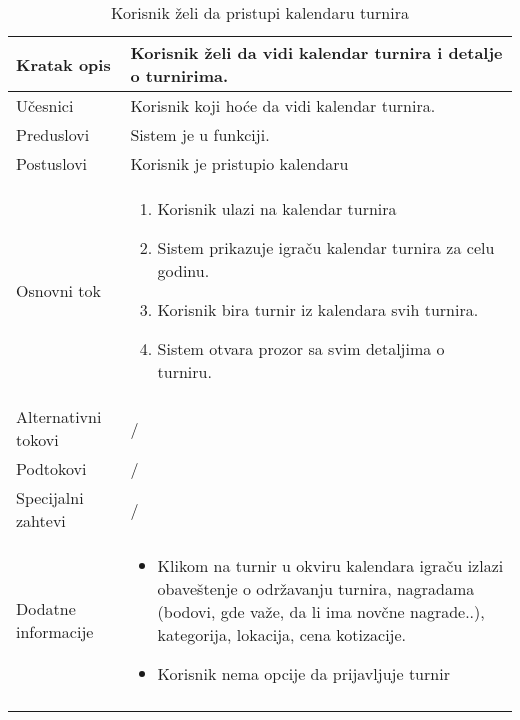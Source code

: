 \documentclass{article}
\begin{document}
         \begin{longtable}{| p{} | p{} |} 
            \hline
                Kratak opis & Korisnik želi da vidi kalendar turnira i detalje o turnirima.\\ 
            \hline    
                Učesnici & Korisnik koji hoće da vidi kalendar turnira. \\
            \hline
               Preduslovi &  Sistem je u funkciji.\\
            \hline  
                Postuslovi &  Korisnik je pristupio kalendaru\\
            \hline
                Osnovni tok & \begin{enumerate}
                    \item Korisnik ulazi na kalendar turnira
                    \item Sistem prikazuje igraču kalendar turnira za celu godinu.
                    \item Korisnik bira turnir iz kalendara svih turnira.
                    \item Sistem otvara prozor sa svim detaljima o turniru.
                \end{enumerate}\\
            \hline
                Alternativni tokovi & /\\
            \hline
                Podtokovi & /\\
            \hline
                Specijalni zahtevi & /\\
            \hline
                Dodatne informacije & \begin{itemize}
                \item Klikom na turnir u okviru kalendara igraču izlazi obaveštenje o održavanju turnira, nagradama (bodovi, gde važe, da li ima novčne nagrade..), kategorija, lokacija, cena kotizacije. 
                \item Korisnik nema opcije da prijavljuje turnir
            \end{itemize} \\
            \hline
            \caption{Korisnik želi da pristupi kalendaru turnira} 
        \end{longtable}
\end{document}
